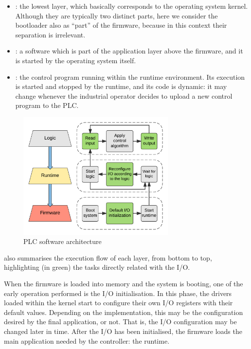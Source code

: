 \begin{itemize}
	\item {}: the lowest layer, which basically corresponds to the operating system kernel. Although they are typically two distinct parts,
		here we consider the bootloader also as ``part'' of the firmware, because in this context their separation is irrelevant.
	\item {}: a software which is part of the application layer above the firmware, and it is started by the operating system itself.
	\item {}: the control program running within the runtime environment. Its execution is started and stopped by the runtime,
		and its code is dynamic: it may change whenever the industrial operator decides to upload a new control program to the PLC.
\end{itemize}

\begin{figure}[h]
\centerline{\includegraphics[width=0.7\textwidth]{res/plc_swarch}}
\caption{PLC software architecture \label{fig:plc_swarch}}
\end{figure}

\myfig{\ref{fig:plc_swarch}} also summarises the execution flow of each layer, from bottom to top, highlighting (in green) the tasks directly related with the I/O.

When the firmware is loaded into memory and the system is booting, one of the early operation performed is the I/O initialisation.
In this phase, the drivers loaded within the kernel start to configure their own I/O registers with their default values.
Depending on the implementation, this may be the configuration desired by the final application, or not. That is, the I/O configuration may be changed later in time.
After the I/O has been initialised, the firmware loads the main application needed by the controller: the runtime.

